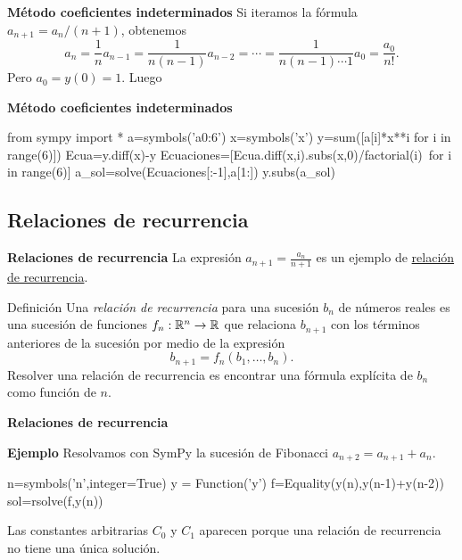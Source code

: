  \begin{frame}{\textbf{Método coeficientes indeterminados}}
Si iteramos la fórmula $a_{n+1}=a_{n}/(n+1)$, obtenemos
\[a_n=\frac{1}{n}a_{n-1}=\frac{1}{n(n-1)}a_{n-2}=\cdots=\frac{1}{n(n-1)\cdots 1}a_{0}=\frac{a_0}{n!}.\]
Pero $a_0=y(0)=1$. Luego

\end{frame}



 \begin{frame}[fragile]{\textbf{Método coeficientes indeterminados}}
\begin{sympyblock}[][numbers=left,frame=single,framesep=5mm]
from sympy import *
a=symbols('a0:6')
x=symbols('x')
y=sum([a[i]*x**i for i in range(6)])
Ecua=y.diff(x)-y
Ecuaciones=[Ecua.diff(x,i).subs(x,0)/factorial(i)\
    for i in range(6)]
a_sol=solve(Ecuaciones[:-1],a[1:])
y.subs(a_sol)
\end{sympyblock}






\end{frame}



\subsection{Relaciones de recurrencia}

 \begin{frame}[fragile]{\textbf{Relaciones de recurrencia}}
La expresión $a_{n+1}=\frac{a_{n}}{n+1}$ es un ejemplo de \href{http://es.wikipedia.org/wiki/Relación_de_recurrencia}{relación de recurrencia}.
\begin{block}{Definición} Una  \emph{relación de recurrencia} para una sucesión $b_n$ de números reales es una sucesión de
funciones $f_n:\mathbb{R}^n\to\mathbb{R}$ que relaciona $b_{n+1}$ con los términos anteriores de la sucesión por medio de
la expresión
\begin{equation}\label{eq:recu} b_{n+1}=f_n(b_1,\ldots,b_n).
\end{equation}
Resolver una relación de recurrencia es encontrar una fórmula explícita de $b_n$ como función de $n$.
 \end{block}
\end{frame}


 \begin{frame}[fragile]{\textbf{Relaciones de recurrencia}}

\textbf{Ejemplo } Resolvamos con SymPy la sucesión de Fibonacci $a_{n+2}=a_{n+1}+a_n$.
\begin{sympyblock}[][numbers=left,frame=single,framesep=5mm]
n=symbols('n',integer=True)
y = Function('y')
f=Equality(y(n),y(n-1)+y(n-2))
sol=rsolve(f,y(n))
\end{sympyblock}
 
 
 
 
Las constantes arbitrarias $C_0$ y $C_1$ aparecen porque una relación de recurrencia no tiene una única solución. 
\end{frame}


